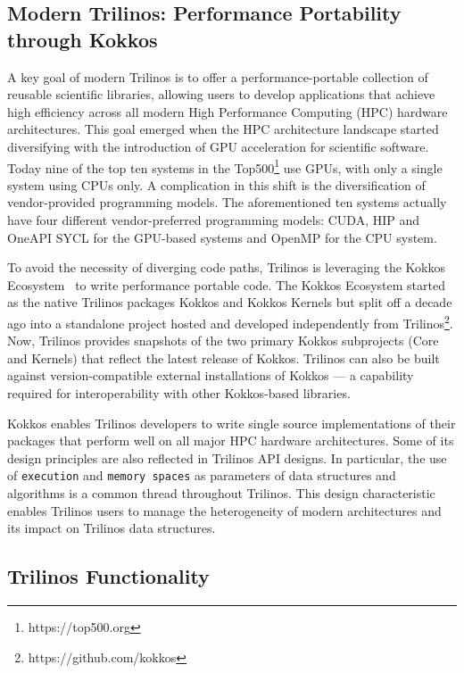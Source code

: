\subsection{Modern Trilinos:  Performance Portability through Kokkos}


A key goal of modern Trilinos is to offer a performance-portable collection of reusable scientific libraries, allowing users to develop applications that achieve high efficiency across all modern High Performance Computing (HPC) hardware architectures.
This goal emerged when the HPC architecture landscape started diversifying with the
introduction of GPU acceleration for scientific software. Today nine of the top ten systems in the Top500\footnote{https://top500.org} use GPUs, with only a single system using CPUs only. A complication in this shift is the diversification of vendor-provided programming models.
The aforementioned ten systems actually have four different vendor-preferred programming models: CUDA, HIP and OneAPI SYCL for the GPU-based systems and OpenMP for the CPU system.

To avoid the necessity of diverging code paths, Trilinos is leveraging the Kokkos Ecosystem~\cite{trott2021kokkos} to write performance portable code. The Kokkos Ecosystem started as the native Trilinos packages Kokkos and Kokkos Kernels but split off a decade ago into a standalone project hosted and developed independently from Trilinos\footnote{https://github.com/kokkos}.
Now, Trilinos provides snapshots of the two primary Kokkos subprojects (Core and Kernels) that reflect the latest release of Kokkos. Trilinos can also be built against version-compatible external installations of Kokkos --- a capability required for interoperability with other Kokkos-based libraries.

Kokkos enables Trilinos developers to write single source implementations of their packages that perform well on all major HPC hardware architectures. Some of its design principles are also reflected in Trilinos API designs. In particular, the
use of \texttt{execution} and \texttt{memory spaces} as parameters of data structures and algorithms is a common thread throughout Trilinos. This design characteristic enables Trilinos users to manage the heterogeneity of modern architectures and its impact on Trilinos data structures.


\subsection{Trilinos Functionality}

